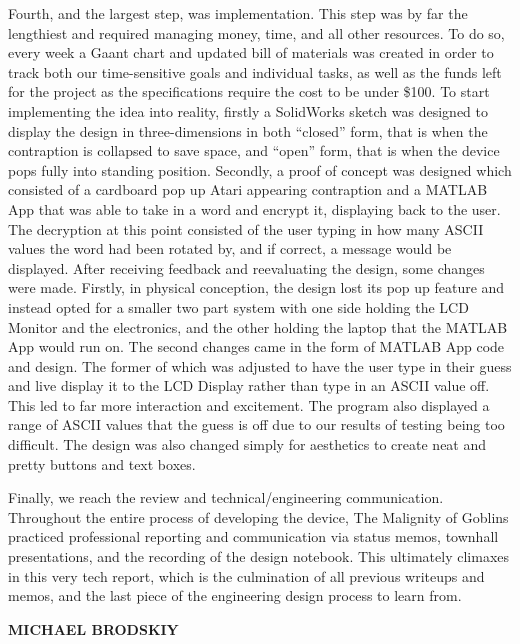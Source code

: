 \documentclass[conference]{IEEEtran}
\begin{document}
\par Fourth, and the largest step, was implementation. This step was by far the lengthiest and required managing money, time, and all other resources. To do so, every week a Gaant chart and updated bill of materials was created in order to track both our time-sensitive goals and individual tasks, as well as the funds left for the project as the specifications require the cost to be under \$100. To start implementing the idea into reality, firstly a SolidWorks sketch was designed to display the design in three-dimensions in both “closed” form, that is when the contraption is collapsed to save space, and “open” form, that is when the device pops fully into standing position. Secondly, a proof of concept was designed which consisted of a cardboard pop up Atari appearing contraption and a MATLAB App that was able to take in a word and encrypt it, displaying back to the user. The decryption at this point consisted of the user typing in how many ASCII values the word had been rotated by, and if correct, a message would be displayed. After receiving feedback and reevaluating the design, some changes were made. Firstly, in physical conception, the design lost its pop up feature and instead opted for a smaller two part system with one side holding the LCD Monitor and the electronics, and the other holding the laptop that the MATLAB App would run on. The second changes came in the form of MATLAB App code and design. The former of which was adjusted to have the user type in their guess and live display it to the LCD Display rather than type in an ASCII value off. This led to far more interaction and excitement. The program also displayed a range of ASCII values that the guess is off due to our results of testing being too difficult. The design was also changed simply for aesthetics to create neat and pretty buttons and text boxes.
\par Finally, we reach the review and technical/engineering communication. Throughout the entire process of developing the device, The Malignity of Goblins practiced professional reporting and communication via status memos, townhall presentations, and the recording of the design notebook. This ultimately climaxes in this very tech report, which is the culmination of all previous writeups and memos, and the last piece of the engineering design process to learn from.

\newpage


\vspace{10pt} \LARGE \textbf{MICHAEL BRODSKIY} \normalsize
\end{document}
